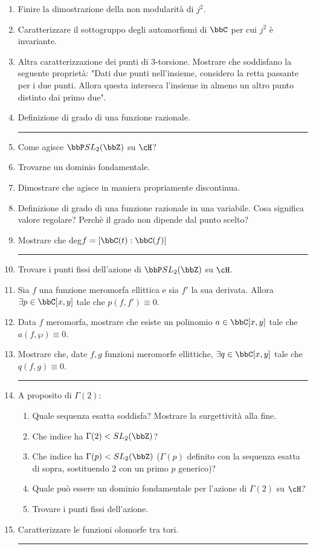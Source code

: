 \begin{enumerate}
\item Finire la dimostrazione della non modularità di $j^2$.
\item Caratterizzare il sottogruppo degli automorfismi di $\bbC$ per cui $j^2$ è invariante.
\item Altra caratterizzazione dei punti di 3-torsione. Mostrare che soddisfano la seguente proprietà: "Dati due punti nell'insieme, considero la retta passante per i due punti. Allora questa interseca l'insieme in almeno un altro punto distinto dai primo due". 
\item Definizione di grado di una funzione razionale.
\bigskip
\hrule
\bigskip

\item Come agisce $\bbP SL_2(\bbZ)$ su $\cH$?
\item Trovarne un dominio fondamentale.
\item Dimostrare che agisce in maniera propriamente discontinua.
\item Definizione di grado di una funzione razionale in una variabile. Cosa significa valore regolare? Perchè il grado non dipende dal punto scelto?
\item Mostrare che deg$f=[\bbC(t):\bbC(f)]$
\bigskip
\hrule
\bigskip

\item Trovare i punti fissi dell'azione di $\bbP SL_{2}(\bbZ)$ su $\cH$.
\item Sia $f$ una funzione meromorfa ellittica e sia $f'$ la sua derivata. Allora $\exists p\in \bbC[x, y]$ tale che $p(f, f')\equiv 0$.
\item Data $f$ meromorfa, mostrare che esiste un polinomio $a\in\bbC[x, y]$ tale che $a(f, \wp)\equiv 0$.
\item Mostrare che, date $f, g$ funzioni meromorfe ellittiche, $\exists q\in \bbC[x, y]$ tale che $q(f, g)\equiv 0$.
\bigskip
\hrule
\bigskip

\item A proposito di $\Gamma(2)$:
\begin{enumerate}[label=(\alph*)]
	\item Quale sequenza esatta soddisfa? Mostrare la surgettività alla fine.
	\item Che indice ha $\Gamma(2) < SL_{2}(\bbZ)$?
	\item Che indice ha $\Gamma(p) < SL_{2}(\bbZ)$ ($\Gamma(p)$ definito con la sequenza esatta di sopra, sostituendo 2 con un primo $p$ generico)?
	\item Quale può essere un dominio fondamentale per l'azione di $\Gamma(2)$ su $\cH$?
	\item Trovare i punti fissi dell'azione.
\end{enumerate}
\item Caratterizzare le funzioni olomorfe tra tori.
\bigskip
\hrule
\bigskip


\end{enumerate}
